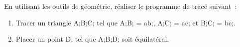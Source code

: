 \documentclass[exercice]{thedocument}%
\begin{document}
%
En utilisant les outils de géométrie, réaliser le programme de tracé suivant~:
\begin{enumerate}
    \item Tracer un triangle \<A;\<B;\<C; tel que \<A;\<B; = \<ab;, \<A;\<C; =
    \<ac; et \<B;\<C; = \<bc;.
    \item Placer un point \<D; tel que \<A;\<B;\<D; soit équilatéral.
\end{enumerate}\vskip200pt
\end{document}
